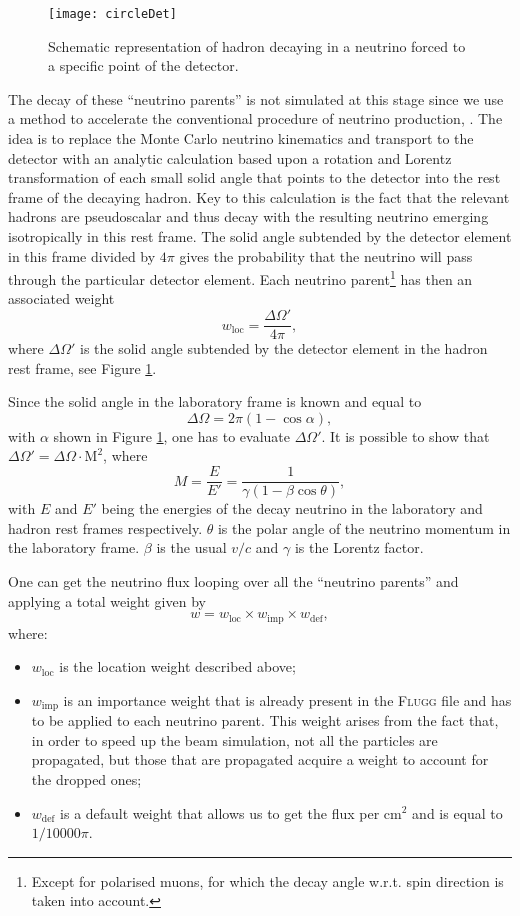 \documentclass[a4paper, oneside, 12pt]{article}
\begin{document}
\begin{figure}[]
\centering
\texttt{[image: circleDet]}
\caption{Schematic representation of hadron decaying in a neutrino forced to a specific point of the detector.}
\label{fig:circleDet}
\end{figure}


The decay of these ``neutrino parents'' is not simulated at this stage since we use a method to accelerate the conventional procedure of neutrino production, \cite{milburn}. The idea is to replace the Monte Carlo neutrino kinematics and transport to the detector with an analytic calculation based upon a rotation and Lorentz transformation of each small solid angle that points to the detector into the rest frame of the decaying hadron. Key to this calculation is the fact that the relevant hadrons are pseudoscalar and thus decay with the resulting neutrino emerging isotropically in this rest frame. The solid angle subtended by the detector element in this frame divided by $4\pi$ gives the probability that the neutrino will pass through the particular detector element. Each neutrino parent\footnote{Except for polarised muons, for which the decay angle w.r.t. spin direction is taken into account.} has then an associated weight
\[
w_\text{loc}=\frac{\Delta \Omega'}{4\pi},
\]
 where $\Delta \Omega'$ is the solid angle subtended by the detector element in the hadron rest frame, see Figure \ref{fig:circleDet}.



Since the solid angle in the laboratory frame is known and equal to
\[
\Delta \Omega = 2\pi (1-\cos\alpha),
\]
with $\alpha$ shown in Figure \ref{fig:circleDet}, one has to evaluate $\Delta \Omega'$. 
It is possible to show \cite{milburn} that $\Delta \Omega' = \Delta \Omega \cdot \text{M}^2$, where
\[
M = \frac{E}{E'} = \frac{1}{\gamma(1-\beta\cos\theta)},
\]
with $E$ and $E'$ being the energies of the decay neutrino in the laboratory and hadron rest frames respectively. $\theta$ is the polar angle of the neutrino momentum in the laboratory frame. $\beta$ is the usual $v/c$ and $\gamma$ is the Lorentz factor. 

One can get the neutrino flux looping over all the ``neutrino parents'' and applying a total weight given by
\[
w = w_\text{loc} \times w_\text{imp} \times w_\text{def},
\]
where:
\begin{itemize}
\item $w_\text{loc}$ is the location weight described above;
\item $w_\text{imp}$ is an importance weight that is already present in the \textsc{Flugg} file and has to be applied to each neutrino parent. This weight arises from the fact that, in order to speed up the beam simulation, not all the particles are propagated, but those that are propagated acquire a weight to account for the dropped ones;
\item $w_\text{def}$ is a default weight that allows us to get the flux per cm$^2$ and is equal to $1/10000\pi$.
\end{itemize}
 
\end{document}
